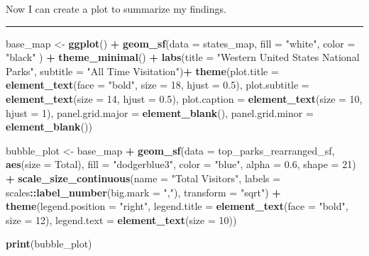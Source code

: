\documentclass[
]{article}
\newenvironment{Shaded}{\begin{snugshade}}{\end{snugshade}}
\newcommand{\AttributeTok}[1]{\textcolor[rgb]{0.13,0.29,0.53}{#1}}
\newcommand{\DecValTok}[1]{\textcolor[rgb]{0.00,0.00,0.81}{#1}}
\newcommand{\FloatTok}[1]{\textcolor[rgb]{0.00,0.00,0.81}{#1}}
\newcommand{\FunctionTok}[1]{\textcolor[rgb]{0.13,0.29,0.53}{\textbf{#1}}}
\newcommand{\NormalTok}[1]{#1}
\newcommand{\OtherTok}[1]{\textcolor[rgb]{0.56,0.35,0.01}{#1}}
\newcommand{\SpecialCharTok}[1]{\textcolor[rgb]{0.81,0.36,0.00}{\textbf{#1}}}
\newcommand{\StringTok}[1]{\textcolor[rgb]{0.31,0.60,0.02}{#1}}
\begin{document}
Now I can create a plot to summarize my findings.

\begin{center}\rule{0.5\linewidth}{0.5pt}\end{center}

\begin{Shaded}
\begin{Highlighting}[]
\NormalTok{base\_map }\OtherTok{\textless{}{-}} \FunctionTok{ggplot}\NormalTok{() }\SpecialCharTok{+}
  \FunctionTok{geom\_sf}\NormalTok{(}\AttributeTok{data =}\NormalTok{ states\_map, }\AttributeTok{fill =} \StringTok{"white"}\NormalTok{, }\AttributeTok{color =} \StringTok{"black"}\NormalTok{ ) }\SpecialCharTok{+}
  \FunctionTok{theme\_minimal}\NormalTok{() }\SpecialCharTok{+}
  \FunctionTok{labs}\NormalTok{(}\AttributeTok{title =} \StringTok{"Western United States National Parks"}\NormalTok{,}
       \AttributeTok{subtitle =} \StringTok{"All Time Visitation"}\NormalTok{)}\SpecialCharTok{+}
  \FunctionTok{theme}\NormalTok{(}\AttributeTok{plot.title =} \FunctionTok{element\_text}\NormalTok{(}\AttributeTok{face =} \StringTok{"bold"}\NormalTok{, }\AttributeTok{size =} \DecValTok{18}\NormalTok{, }\AttributeTok{hjust =} \FloatTok{0.5}\NormalTok{),}
        \AttributeTok{plot.subtitle =} \FunctionTok{element\_text}\NormalTok{(}\AttributeTok{size =} \DecValTok{14}\NormalTok{, }\AttributeTok{hjust =} \FloatTok{0.5}\NormalTok{),}
        \AttributeTok{plot.caption =} \FunctionTok{element\_text}\NormalTok{(}\AttributeTok{size =} \DecValTok{10}\NormalTok{, }\AttributeTok{hjust =} \DecValTok{1}\NormalTok{),}
        \AttributeTok{panel.grid.major =} \FunctionTok{element\_blank}\NormalTok{(),}
        \AttributeTok{panel.grid.minor =} \FunctionTok{element\_blank}\NormalTok{())}


\NormalTok{bubble\_plot }\OtherTok{\textless{}{-}}\NormalTok{ base\_map }\SpecialCharTok{+}
  \FunctionTok{geom\_sf}\NormalTok{(}\AttributeTok{data =}\NormalTok{ top\_parks\_rearranged\_sf, }\FunctionTok{aes}\NormalTok{(}\AttributeTok{size =}\NormalTok{ Total), }\AttributeTok{fill =} \StringTok{"dodgerblue3"}\NormalTok{, }\AttributeTok{color =} \StringTok{"blue"}\NormalTok{, }\AttributeTok{alpha =} \FloatTok{0.6}\NormalTok{, }\AttributeTok{shape =} \DecValTok{21}\NormalTok{) }\SpecialCharTok{+} 
  \FunctionTok{scale\_size\_continuous}\NormalTok{(}\AttributeTok{name =} \StringTok{"Total Visitors"}\NormalTok{, }
                        \AttributeTok{labels =}\NormalTok{ scales}\SpecialCharTok{::}\FunctionTok{label\_number}\NormalTok{(}\AttributeTok{big.mark =} \StringTok{","}\NormalTok{),}
                        \AttributeTok{transform =} \StringTok{"sqrt"}\NormalTok{) }\SpecialCharTok{+}
  \FunctionTok{theme}\NormalTok{(}\AttributeTok{legend.position =} \StringTok{"right"}\NormalTok{,}
        \AttributeTok{legend.title =} \FunctionTok{element\_text}\NormalTok{(}\AttributeTok{face =} \StringTok{"bold"}\NormalTok{, }\AttributeTok{size =} \DecValTok{12}\NormalTok{),}
        \AttributeTok{legend.text =} \FunctionTok{element\_text}\NormalTok{(}\AttributeTok{size =} \DecValTok{10}\NormalTok{))}

\FunctionTok{print}\NormalTok{(bubble\_plot)}
\end{Highlighting}
\end{Shaded}
\end{document}
